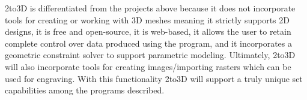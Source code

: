 2to3D is differentiated from the projects above because it does not incorporate tools for creating or working with 3D meshes meaning it strictly supports 2D designs, it is free and open-source, it is web-based, it allows the user to retain complete control over data produced using the program, and it incorporates a geometric constraint solver to support parametric modeling. Ultimately, 2to3D will also incorporate tools for creating images/importing rasters which can be used for engraving. With this functionality 2to3D will support a truly unique set capabilities among the programs described.
